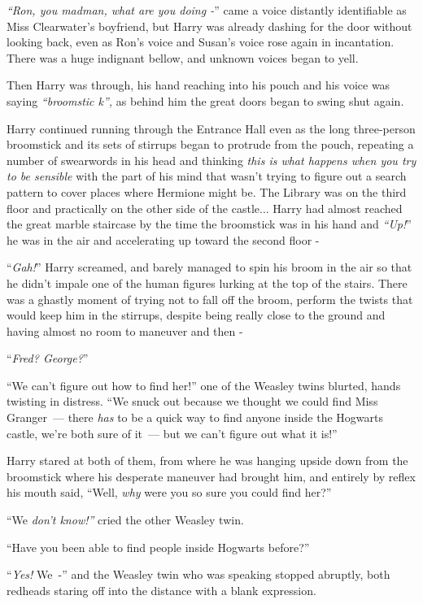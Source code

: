 \emph{``Ron, you madman, what are you doing -}'' came a voice distantly identifiable as Miss Clearwater's boyfriend, but Harry was already dashing for the door without looking back, even as Ron's voice and Susan's voice rose again in incantation. There was a huge indignant bellow, and unknown voices began to yell.

Then Harry was through, his hand reaching into his pouch and his voice was saying \emph{``broomstic k'',} as behind him the great doors began to swing shut again.

Harry continued running through the Entrance Hall even as the long three-person broomstick and its sets of stirrups began to protrude from the pouch, repeating a number of swearwords in his head and thinking \emph{this is what happens when you try to be sensible} with the part of his mind that wasn't trying to figure out a search pattern to cover places where Hermione might be. The Library was on the third floor and practically on the other side of the castle... Harry had almost reached the great marble staircase by the time the broomstick was in his hand and \emph{``Up!}'' he was in the air and accelerating up toward the second floor -

``\emph{Gah!}'' Harry screamed, and barely managed to spin his broom in the air so that he didn't impale one of the human figures lurking at the top of the stairs. There was a ghastly moment of trying not to fall off the broom, perform the twists that would keep him in the stirrups, despite being really close to the ground and having almost no room to maneuver and then -

``\emph{Fred? George?}''

``We can't figure out how to find her!'' one of the Weasley twins blurted, hands twisting in distress. ``We snuck out because we thought we could find Miss Granger~--- there \emph{has} to be a quick way to find anyone inside the Hogwarts castle, we're both sure of it~--- but we can't figure out what it is!''

Harry stared at both of them, from where he was hanging upside down from the broomstick where his desperate maneuver had brought him, and entirely by reflex his mouth said, ``Well, \emph{why} were you so sure you could find her?''

``We \emph{don't know!''} cried the other Weasley twin.

``Have you been able to find people inside Hogwarts before?''

``\emph{Yes!} We~-'' and the Weasley twin who was speaking stopped abruptly, both redheads staring off into the distance with a blank expression.

